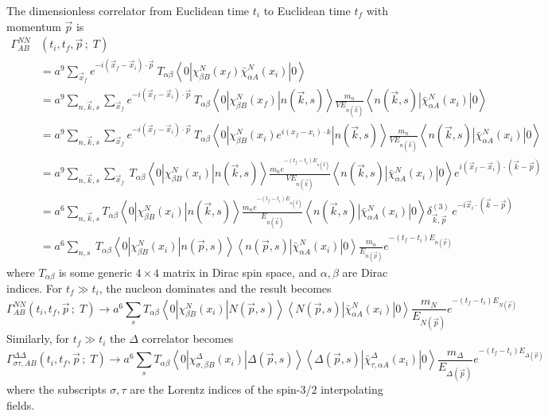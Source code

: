 \documentclass[12pt]{article}
\begin{document}
The dimensionless correlator from Euclidean time $t_i$ to Euclidean time $t_f$
with momentum $\vec p$ is
\[
\begin{split}
\Gamma^{NN}_{AB}&(t_i,t_f,\vec{p}\,;\;T) \\
 &= a^9\sum_{{\vec x}_f}e^{-i(\vec{x}_f-\vec{x}_i)\cdot\vec{p}}\  T_{\alpha\beta}
    \left<0\left|\chi^N_{\beta B}(x_f)\bar\chi^N_{\alpha A}(x_i)\right|0\right> \\
 &= a^9\sum_{n,\vec{k},s}\sum_{{\vec x}_f}
     e^{-i(\vec{x}_f-\vec{x}_i)\cdot\vec{p}}\  T_{\alpha\beta}
     \left<0\left|\chi^N_{\beta B}(x_f)\right|n(\vec{k},s)\right>
     \frac{m_n}{VE_{n(\vec{k})}}
     \left<n(\vec{k},s)\left|\bar\chi^N_{\alpha A}(x_i)\right|0\right> \\
 &= a^9\sum_{n,\vec{k},s}\sum_{{\vec x}_f}
     e^{-i(\vec{x}_f-\vec{x}_i)\cdot\vec{p}}\  T_{\alpha\beta}
     \left<0\left|\chi^N_{\beta B}(x_i)e^{i(x_f-x_i)\cdot k}\right|n(\vec{k},s)
     \right>\frac{m_n}{VE_{n(\vec{k})}}
     \left<n(\vec{k},s)\left|\bar\chi^N_{\alpha A}(x_i)\right|0\right> \\
 &= a^9\sum_{n,\vec{k},s}\sum_{{\vec x}_f}\  T_{\alpha\beta}
     \left<0\left|\chi^N_{\beta B}(x_i)\right|n(\vec{k},s)\right>
     \frac{m_ne^{-(t_f-t_i)E_{n(\vec{k})}}}{VE_{n(\vec{k})}}
     \left<n(\vec{k},s)\left|\bar\chi^N_{\alpha A}(x_i)\right|0\right>
     e^{i(\vec{x}_f-\vec{x}_i)\cdot(\vec{k}-\vec{p})} \\
 &= a^6\sum_{n,\vec{k},s}T_{\alpha\beta} 
     \left<0\left|\chi^N_{\beta B}(x_i)\right|n(\vec{k},s)
     \right>\frac{m_ne^{-(t_f-t_i)E_{n(\vec{k})}}}{E_{n(\vec{k})}}
     \left<n(\vec{k},s)\left|\bar\chi^N_{\alpha A}(x_i)\right|0\right>
     \delta^{(3)}_{\vec{k},\vec{p}}\,e^{-i\vec{x}_i\cdot(\vec{k}-\vec{p})} \\
 &= a^6\sum_{n,s}\  T_{\alpha\beta}
     \left<0\left|\chi^N_{\beta B}(x_i)\right|n(\vec{p},s)\right>
     \left<n(\vec{p},s)\left|\bar\chi^N_{\alpha A}(x_i)\right|0\right>
     \frac{m_n}{E_{n(\vec{p})}}e^{-(t_f-t_i)E_{n(\vec{p})}}
\end{split}
\]
where $T_{\alpha\beta}$ is some generic $4\times 4$ matrix in
Dirac spin space, and $\alpha,\beta$ are Dirac indices.
For $t_f\gg t_i$, the nucleon dominates and the result becomes
\[
\Gamma^{NN}_{AB}(t_i,t_f,\vec{p}\,;\;T) \to
     a^6\sum_s T_{\alpha\beta}
     \left<0\left|\chi^N_{\beta B}(x_i)\right|N(\vec{p},s)\right>
     \left<N(\vec{p},s)\left|\bar\chi^N_{\alpha A}(x_i)\right|0\right>
     \frac{m_N}{E_{N(\vec{p})}}e^{-(t_f-t_i)E_{N(\vec{p})}}
\]
Similarly, for $t_f\gg t_i$ the ${\Delta}$ correlator becomes
\[
\Gamma^{\Delta\Delta}_{\sigma\tau,AB}(t_i,t_f,\vec{p}\,;\;T) \to
     a^6\sum_s T_{\alpha\beta}
     \left<0\left|\chi^{\Delta}_{\sigma,\beta B}(x_i)\right|\Delta(\vec{p},s)\right>
     \left<\Delta(\vec{p},s)\left|\bar\chi^{\Delta}_{\tau,\alpha A}(x_i)\right|0\right>
     \frac{m_{\Delta}}{E_{\Delta(\vec{p})}}e^{-(t_f-t_i)E_{\Delta(\vec{p})}}
\]
where the subscripts $\sigma,\tau$ are the Lorentz indices of the spin-3/2
interpolating fields.
\end{document}
